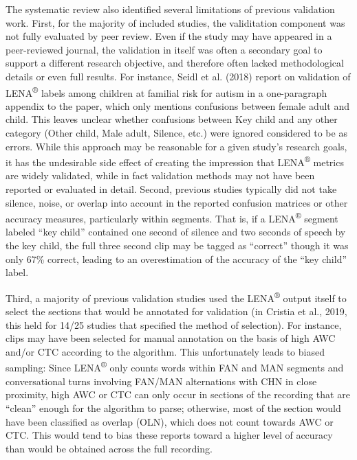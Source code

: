 \documentclass[english,table,man,floatsintext]{apa6}
\begin{document}
The systematic review also identified several limitations of previous validation work. First, for the majority of included studies, the validitation component was not fully evaluated by peer review. Even if the study may have appeared in a peer-reviewed journal, the validation in itself was often a secondary goal to support a different research objective, and therefore often lacked methodological details or even full results. For instance, Seidl et al. (2018) report on validation of LENA\textsuperscript{®} labels among children at familial risk for autism in a one-paragraph appendix to the paper, which only mentions confusions between female adult and child. This leaves unclear whether confusions between Key child and any other category (Other child, Male adult, Silence, etc.) were ignored considered to be as errors. While this approach may be reasonable for a given study's research goals, it has the undesirable side effect of creating the impression that LENA\textsuperscript{®} metrics are widely validated, while in fact validation methods may not have been reported or evaluated in detail.
Second, previous studies typically did not take silence, noise, or overlap into account in the reported confusion matrices or other accuracy measures, particularly within segments. That is, if a LENA\textsuperscript{®} segment labeled \enquote{key child} contained one second of silence and two seconds of speech by the key child, the full three second clip may be tagged as \enquote{correct} though it was only 67\% correct, leading to an overestimation of the accuracy of the \enquote{key child} label.

Third, a majority of previous validation studies used the LENA\textsuperscript{®} output itself to select the sections that would be annotated for validation (in Cristia et al., 2019, this held for 14/25 studies that specified the method of selection). For instance, clips may have been selected for manual annotation on the basis of high AWC and/or CTC according to the algorithm. This unfortunately leads to biased sampling: Since LENA\textsuperscript{®} only counts words within FAN and MAN segments and conversational turns involving FAN/MAN alternations with CHN in close proximity, high AWC or CTC can only occur in sections of the recording that are \enquote{clean} enough for the algorithm to parse; otherwise, most of the section would have been classified as overlap (OLN), which does not count towards AWC or CTC. This would tend to bias these reports toward a higher level of accuracy than would be obtained across the full recording.
\end{document}
